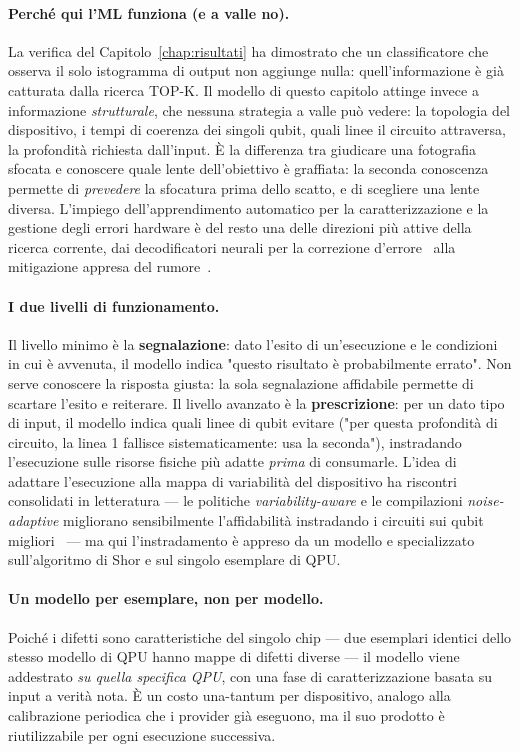 \begin{onehalfspace}
\paragraph{Perché qui l'ML funziona (e a valle no).}
La verifica del Capitolo~\ref{chap:risultati} ha dimostrato che un classificatore che osserva il solo istogramma di output non aggiunge nulla: quell'informazione è già catturata dalla ricerca TOP-K. Il modello di questo capitolo attinge invece a informazione \emph{strutturale}, che nessuna strategia a valle può vedere: la topologia del dispositivo, i tempi di coerenza dei singoli qubit, quali linee il circuito attraversa, la profondità richiesta dall'input. È la differenza tra giudicare una fotografia sfocata e conoscere quale lente dell'obiettivo è graffiata: la seconda conoscenza permette di \emph{prevedere} la sfocatura prima dello scatto, e di scegliere una lente diversa. L'impiego dell'apprendimento automatico per la caratterizzazione e la gestione degli errori hardware è del resto una delle direzioni più attive della ricerca corrente, dai decodificatori neurali per la correzione d'errore~\cite{alphaqubit2024, transformer_decoder2023} alla mitigazione appresa del rumore~\cite{ml_mitigation2023}.

\paragraph{I due livelli di funzionamento.}
Il livello minimo è la \textbf{segnalazione}: dato l'esito di un'esecuzione e le condizioni in cui è avvenuta, il modello indica "questo risultato è probabilmente errato". Non serve conoscere la risposta giusta: la sola segnalazione affidabile permette di scartare l'esito e reiterare. Il livello avanzato è la \textbf{prescrizione}: per un dato tipo di input, il modello indica quali linee di qubit evitare ("per questa profondità di circuito, la linea 1 fallisce sistematicamente: usa la seconda"), instradando l'esecuzione sulle risorse fisiche più adatte \emph{prima} di consumarle. L'idea di adattare l'esecuzione alla mappa di variabilità del dispositivo ha riscontri consolidati in letteratura --- le politiche \textit{variability-aware} e le compilazioni \textit{noise-adaptive} migliorano sensibilmente l'affidabilità instradando i circuiti sui qubit migliori~\cite{tannu2019, murali2019} --- ma qui l'instradamento è appreso da un modello e specializzato sull'algoritmo di Shor e sul singolo esemplare di QPU.

\paragraph{Un modello per esemplare, non per modello.}
Poiché i difetti sono caratteristiche del singolo chip --- due esemplari identici dello stesso modello di QPU hanno mappe di difetti diverse --- il modello viene addestrato \emph{su quella specifica QPU}, con una fase di caratterizzazione basata su input a verità nota. È un costo una-tantum per dispositivo, analogo alla calibrazione periodica che i provider già eseguono, ma il suo prodotto è riutilizzabile per ogni esecuzione successiva.


\end{onehalfspace}
